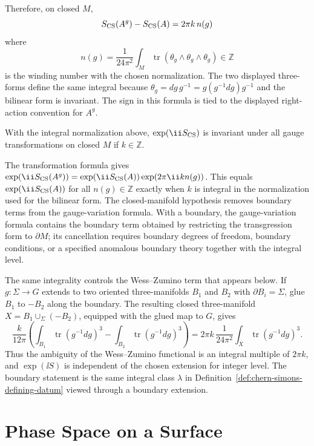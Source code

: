 Therefore, on closed \(M\),
\[
  S_{\rm CS}(A^g)-S_{\rm CS}(A)
  =
  2\pi k\, n(g)
\]
where
\[
  n(g)
  =
  \frac{1}{24\pi^2}
  \int_M\operatorname{tr}(\theta_g\wedge\theta_g\wedge\theta_g)
  \in\mathbb Z
\]
is the winding number with the chosen normalization.  The two displayed
three-forms define the same integral because
\(\theta_g=dg\,g^{-1}=g(g^{-1}dg)g^{-1}\) and the bilinear form is invariant.
The sign in this formula is tied to the displayed right-action convention for
\(A^g\).

\begin{remark}
\label{rem:cs-level-quantization}
With the integral normalization above, \(\exp(\ii S_{\rm CS})\) is invariant
under all gauge transformations on closed \(M\) if \(k\in\mathbb Z\).

The transformation formula gives
\(\exp(\ii S_{\rm CS}(A^g))=\exp(\ii S_{\rm CS}(A))\exp(2\pi\ii k n(g))\).
This equals \(\exp(\ii S_{\rm CS}(A))\) for all \(n(g)\in\mathbb Z\) exactly
when \(k\) is integral in the normalization used for the bilinear form.  The
closed-manifold hypothesis removes boundary terms from the gauge-variation
formula.  With a boundary, the gauge-variation formula contains the boundary
term obtained by restricting the transgression form to \(\partial M\); its
cancellation requires boundary degrees of freedom, boundary conditions, or a
specified anomalous boundary theory together with the integral level.
\end{remark}

The same integrality controls the Wess--Zumino term that appears below.  If
\(g:\Sigma\to G\) extends to two oriented three-manifolds \(B_1\) and \(B_2\)
with \(\partial B_i=\Sigma\), glue \(B_1\) to \(-B_2\) along the boundary.
The resulting closed three-manifold \(X=B_1\cup_\Sigma(-B_2)\), equipped with
the glued map to \(G\), gives
\[
  \frac{k}{12\pi}
  \left(\int_{B_1}\operatorname{tr}(g^{-1}dg)^3
        -\int_{B_2}\operatorname{tr}(g^{-1}dg)^3\right)
  =
  2\pi k\,
  \frac{1}{24\pi^2}\int_X\operatorname{tr}(g^{-1}dg)^3 .
\]
Thus the ambiguity of the Wess--Zumino functional is an integral multiple of
\(2\pi k\), and \(\exp(\ii S)\) is independent of the chosen extension for
integer level.  The boundary statement is the same integral class
\(\lambda\) in Definition~\ref{def:chern-simons-defining-datum} viewed through
a boundary extension.

\section{Phase Space on a Surface}

